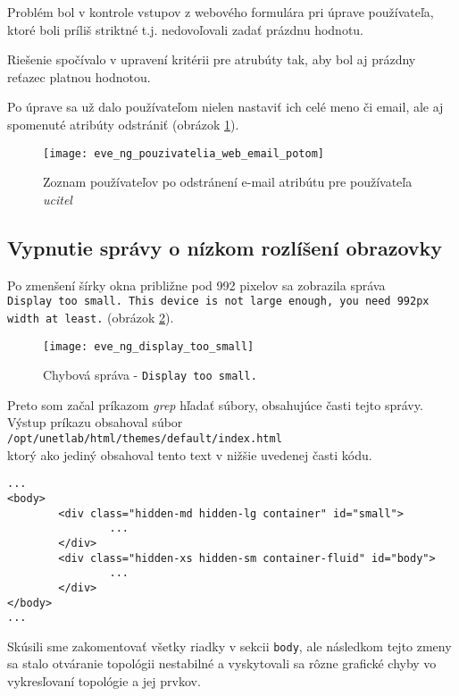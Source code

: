 Problém bol v kontrole vstupov z webového formulára pri úprave používateľa, ktoré boli príliš striktné t.j. nedovoľovali zadať prázdnu hodnotu.

Riešenie spočívalo v upravení kritérii pre atrubúty tak, aby bol aj prázdny reťazec platnou hodnotou.

Po úprave sa už dalo používateľom nielen nastaviť ich celé meno či email, ale aj spomenuté atribúty odstrániť (obrázok \ref{obr:eve_ng_pouzivatelia_web_email_potom}).

\begin{figure}
    \centering
    \texttt{[image: eve\_ng\_pouzivatelia\_web\_email\_potom]}
    \caption{Zoznam používateľov po odstránení e-mail atribútu pre používateľa \emph{ucitel}}
    \label{obr:eve_ng_pouzivatelia_web_email_potom}
\end{figure}




\subsection{Vypnutie správy o nízkom rozlíšení obrazovky}

Po zmenšení šírky okna približne pod 992 pixelov sa zobrazila správa \\
\texttt{Display too small. This device is not large enough, you need 992px width at least.} (obrázok \ref{obr:eve_ng_display_too_small}).

\begin{figure}
    \centering
    \texttt{[image: eve\_ng\_display\_too\_small]}
    \caption{Chybová správa - \texttt{Display too small.}}
    \label{obr:eve_ng_display_too_small}
\end{figure}

Preto som začal príkazom \emph{grep} hľadať súbory, obsahujúce časti tejto správy. Výstup príkazu obsahoval súbor \\ \texttt{/opt/unetlab/html/themes/default/index.html} \\
ktorý ako jediný obsahoval tento text v nižšie uvedenej časti kódu.

\begin{verbatim}
...
<body>
        <div class="hidden-md hidden-lg container" id="small">
                ...
        </div>
        <div class="hidden-xs hidden-sm container-fluid" id="body">
                ...
        </div>
</body>
...
\end{verbatim}

Skúsili sme zakomentovať všetky riadky v sekcii \texttt{body}, ale následkom tejto zmeny sa stalo otváranie topológii nestabilné a vyskytovali sa rôzne grafické chyby vo vykresľovaní topológie a jej prvkov.


